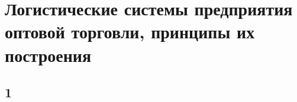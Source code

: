 \section{Логистические системы предприятия оптовой торговли, принципы их построения}
\subsection{1}
